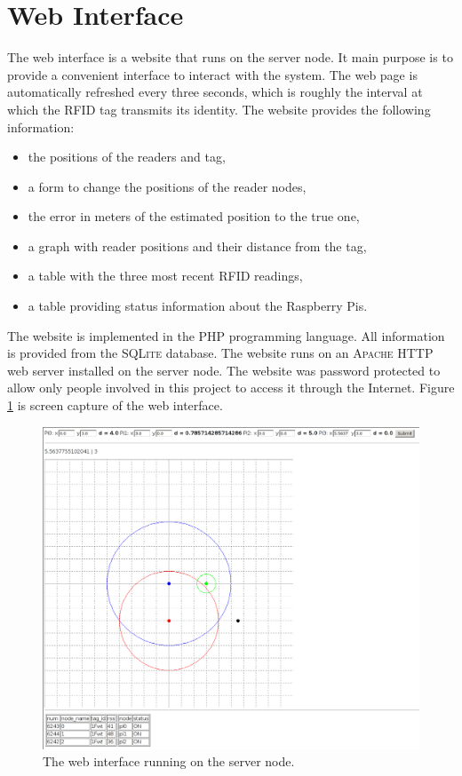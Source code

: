 \section{Web Interface}
\label{sec:webint}

The web interface is a website that runs on the server node. It main purpose is to provide a convenient interface to interact with the system. The web page is automatically refreshed every three seconds, which is roughly the interval at which the RFID tag transmits its identity. The website provides the following information:

\begin{itemize}
	\item the positions of the readers and tag,
	\item a form to change the positions of the reader nodes,
	\item the error in meters of the estimated position to the true one,
	\item a graph with reader positions and their distance from the tag,
	\item a table with the three most recent RFID readings,
	\item a table providing status information about the Raspberry Pis. 
\end{itemize}

The website is implemented in the \textsc{PHP} programming language. All information is provided from the \textsc{SQLite} database. The website runs on an \textsc{Apache} HTTP web server installed on the server node. The website was password protected to allow only people involved in this project to access it through the Internet. Figure \ref{fig:web} is screen capture of the web interface.

\begin{figure}[h]
	\begin{center}
		\includegraphics[width=.8\textwidth]{figures/sim}
		\caption{The web interface running on the server node.}
		\label{fig:web}
	\end{center}
\end{figure}

